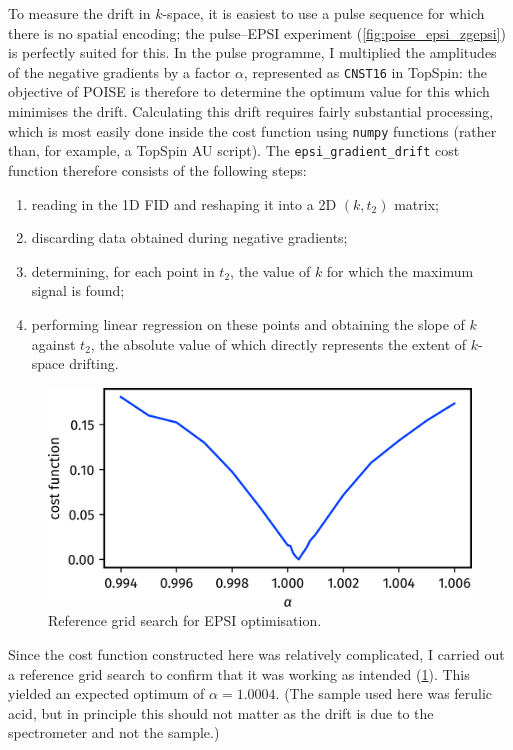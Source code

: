 To measure the drift in $k$-space, it is easiest to use a pulse sequence for which there is no spatial encoding; the pulse--EPSI experiment (\cref{fig:poise_epsi_zgepsi}) is perfectly suited for this.
In the pulse programme, I multiplied the amplitudes of the negative gradients by a factor $\alpha$, represented as \texttt{CNST16} in TopSpin:
the objective of POISE is therefore to determine the optimum value for this which minimises the drift.
Calculating this drift requires fairly substantial processing, which is most easily done inside the cost function using \texttt{numpy} functions (rather than, for example, a TopSpin AU script).
The \texttt{epsi\_gradient\_drift} cost function therefore consists of the following steps:
\begin{enumerate}
    \item reading in the 1D FID and reshaping it into a 2D $(k, t_2)$ matrix;
    \item discarding data obtained during negative gradients;
    \item determining, for each point in $t_2$, the value of $k$ for which the maximum signal is found;
    \item performing linear regression on these points and obtaining the slope of $k$ against $t_2$, the absolute value of which directly represents the extent of $k$-space drifting.
\end{enumerate}

\begin{figure}[htb]
    \centering
    \includegraphics[]{figures/poise/epsi_scan.png}%
    \caption[Reference grid search for EPSI optimisation]{
        Reference grid search for EPSI optimisation.
    }
    \label{fig:poise_epsi_scan}
\end{figure}

Since the cost function constructed here was relatively complicated, I carried out a reference grid search to confirm that it was working as intended (\cref{fig:poise_epsi_scan}).
This yielded an expected optimum of $\alpha = 1.0004$.
(The sample used here was ferulic acid, but in principle this should not matter as the drift is due to the spectrometer and not the sample.)

